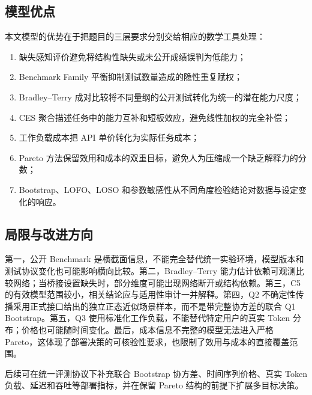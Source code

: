 \subsection{模型优点}

本文模型的优势在于把题目的三层要求分别交给相应的数学工具处理：
\begin{enumerate}[label=(\arabic*),leftmargin=2.5em]
\item 缺失感知评价避免将结构性缺失或未公开成绩误判为低能力；
\item Benchmark Family 平衡抑制测试数量造成的隐性重复赋权；
\item Bradley--Terry 成对比较将不同量纲的公开测试转化为统一的潜在能力尺度；
\item CES 聚合描述任务中的能力互补和短板效应，避免线性加权的完全补偿；
\item 工作负载成本把 API 单价转化为实际任务成本；
\item Pareto 方法保留效用和成本的双重目标，避免人为压缩成一个缺乏解释力的分数；
\item Bootstrap、LOFO、LOSO 和参数敏感性从不同角度检验结论对数据与设定变化的响应。
\end{enumerate}

\subsection{局限与改进方向}

第一，公开 Benchmark 是横截面信息，不能完全替代统一实验环境，模型版本和测试协议变化也可能影响横向比较。第二，Bradley--Terry 能力估计依赖可观测比较网络；当桥接设置缺失时，部分维度可能出现网络断开或结构依赖。第三，C5 的有效模型范围较小，相关结论应与适用性审计一并解释。第四，Q2 不确定性传播采用正式接口给出的独立正态近似场景样本，而不是带完整协方差的联合 Q1 Bootstrap。第五，Q3 使用标准化工作负载，不能替代特定用户的真实 Token 分布；价格也可能随时间变化。最后，成本信息不完整的模型无法进入严格 Pareto，这体现了部署决策的可核验性要求，也限制了效用与成本的直接覆盖范围。

后续可在统一评测协议下补充联合 Bootstrap 协方差、时间序列价格、真实 Token 负载、延迟和吞吐等部署指标，并在保留 Pareto 结构的前提下扩展多目标决策。
